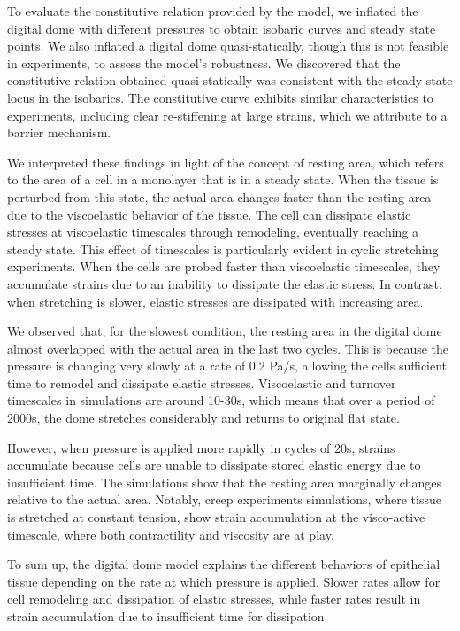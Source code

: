 To evaluate the constitutive relation provided by the model, we inflated
the digital dome with different pressures to obtain isobaric curves and
steady state points. We also inflated a digital dome quasi-statically,
though this is not feasible in experiments, to assess the model's
robustness. We discovered that the constitutive relation obtained
quasi-statically was consistent with the steady state locus in the
isobarics. The constitutive curve exhibits similar characteristics to
experiments, including clear re-stiffening at large strains, which we
attribute to a barrier mechanism.

We interpreted these findings in light of the concept of resting area,
which refers to the area of a cell in a monolayer that is in a steady
state. When the tissue is perturbed from this state, the actual area
changes faster than the resting area due to the viscoelastic behavior of
the tissue. The cell can dissipate elastic stresses at viscoelastic
timescales through remodeling, eventually reaching a steady state. This
effect of timescales is particularly evident in cyclic stretching
experiments. When the cells are probed faster than viscoelastic
timescales, they accumulate strains due to an inability to dissipate the
elastic stress. In contrast, when stretching is slower, elastic stresses
are dissipated with increasing area.

We observed that, for the slowest condition, the resting area in the
digital dome almost overlapped with the actual area in the last two
cycles. This is because the pressure is changing very slowly at a rate
of 0.2 Pa/s, allowing the cells sufficient time to remodel and dissipate
elastic stresses. Viscoelastic and turnover timescales in simulations
are around 10-30s, which means that over a period of 2000s, the dome
stretches considerably and returns to original flat state.

However, when pressure is applied more rapidly in cycles of 20s, strains
accumulate because cells are unable to dissipate stored elastic energy
due to insufficient time. The simulations show that the resting area
marginally changes relative to the actual area. Notably, creep
experiments simulations, where tissue is stretched at constant tension,
show strain accumulation at the visco-active timescale, where both
contractility and viscosity are at play.

To sum up, the digital dome model explains the different behaviors of
epithelial tissue depending on the rate at which pressure is applied.
Slower rates allow for cell remodeling and dissipation of elastic
stresses, while faster rates result in strain accumulation due to
insufficient time for dissipation.

